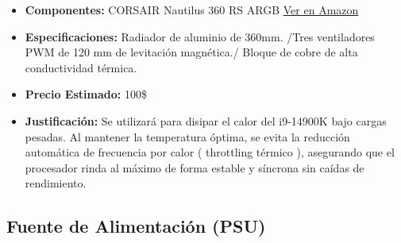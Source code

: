 \documentclass[12pt,a4paper]{article}
\begin{document}
\begin{itemize}
    \item \textbf{Componentes:} CORSAIR Nautilus 360 RS ARGB
    \href{https://www.amazon.com/-/es/CORSAIR-Nautilus-ARGB-Enfriador-l%C3%ADquido/dp/B0DF7C4YPQ/ref=sr_1_13?__mk_es_US=%C3%85M%C3%85%C5%BD%C3%95%C3%91&crid=H2XHFS3T6ZCN&dib=eyJ2IjoiMSJ9.GUN0IW54Z3-ZVJ-sg0S1IGRzjwCIVzeB_guRt6enlJa95-xvR_9FfXLXfDmIGMDIsH5_m-2B1jbuXV8ADLEWNRlaoDPylFTUahPizVUaenP-J0n3ZSxvDUc0vHJERZss8AIq_HeOVzhiDF85dt9Tb1RjZ_HNE5-kwSrxIeDQw-B5jwWx8PT7oEYuXIwwk3VLjbgz8UMe5uGfcsEJAkUqNloUgMyUeG83uBN2K3JMzVA.RKJhb9uHN1xWaqWBrHsnr0ZRGOVvKA55MCvfg8ipmk0&dib_tag=se&keywords=sistema%2Bde%2Benfriamiento%2Bpara%2Bpc%2BRadiador%2Bde%2Baluminio%2Bde%2B360mm.%2B%2FTres%2Bventiladores%2BPWM%2Bde%2B120%2Bmm%2Bde%2Blevitaci%C3%B3n%2Bmagn%C3%A9tica.%2F%2BBloque%2Bde%2Bcobre%2Bde%2Balta%2Bconductividad%2Bt%C3%A9rmica.&nsdOptOutParam=true&qid=1779457580&sprefix=sistema%2Bde%2Benfriamiento%2Bpara%2Bpc%2Bradiador%2Bde%2Baluminio%2Bde%2B360mm.%2B%2Ftres%2Bventiladores%2Bpwm%2Bde%2B120%2Bmm%2Bde%2Blevitaci%C3%B3n%2Bmagn%C3%A9tica.%2F%2Bbloque%2Bde%2Bcobre%2Bde%2Balta%2Bconductividad%2Bt%C3%A9rmica.%2Caps%2C543&sr=8-13&th=1}{Ver en Amazon}
    \item \textbf{Especificaciones:} Radiador de aluminio de 360mm. /Tres ventiladores PWM de 120 mm de levitación magnética./ Bloque de cobre de alta conductividad térmica.
    \item \textbf{Precio Estimado:} 100\$
    \item \textbf{Justificación:} Se utilizará para disipar el calor del i9-14900K bajo cargas pesadas. Al mantener la temperatura óptima, se evita la reducción automática de frecuencia por calor ( throttling térmico ), asegurando que el procesador rinda al máximo de forma estable y síncrona sin caídas de rendimiento.
\end{itemize}

\subsection{Fuente de Alimentación (PSU)}
\end{document}

